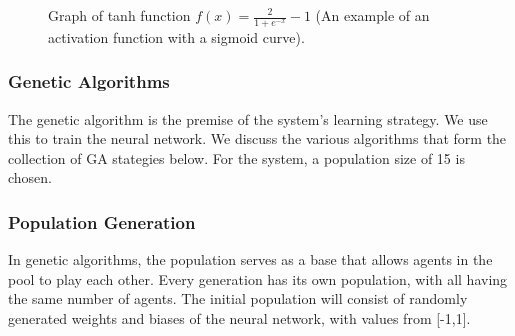 \documentclass[12pt,a4paper]{article}
\begin{document}
    \begin{figure}
        \centering
        \vspace{-30pt}
        \caption{Graph of tanh function $f(x)={\frac{2}{1+e^{-x}}- 1}$ (An example of an activation function with a sigmoid curve). \label{sigmoid}}
        \vspace{-30pt}
    \end{figure}

\subsubsection{Genetic Algorithms} 

    The genetic algorithm is the premise of the system's learning strategy. We use this to train the neural network. We discuss the various algorithms that form the collection of GA stategies below. For the system, a population size of 15 is chosen.

\subsubsection{Population Generation}
    In genetic algorithms, the population serves as a base that allows agents in the pool to play each other. Every generation has its own population, with all having the same number of agents. The initial population will consist of randomly generated weights and biases of the neural network, with values from [-1,1]. 
    
\end{document}
